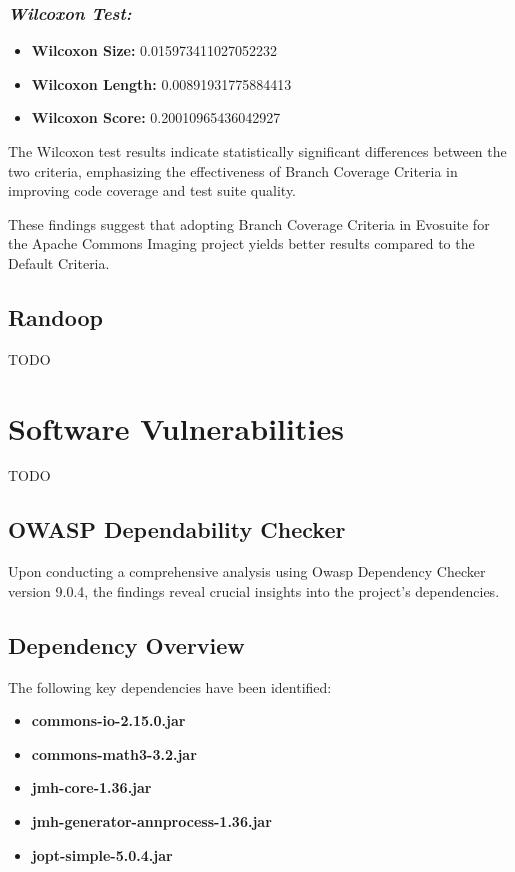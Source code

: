 \documentclass[sigconf]{acmart}
\begin{document}
\subsubsection{\textit{Wilcoxon Test:}}
\begin{itemize}
    \item \textbf{Wilcoxon Size:} 0.015973411027052232
    \item \textbf{Wilcoxon Length:} 0.00891931775884413
    \item \textbf{Wilcoxon Score:} 0.20010965436042927
\end{itemize}

The Wilcoxon test results indicate statistically significant differences between the two criteria, emphasizing the effectiveness of Branch Coverage Criteria in improving code coverage and test suite quality.

These findings suggest that adopting Branch Coverage Criteria in Evosuite for the Apache Commons Imaging project yields better results compared to the Default Criteria.

\subsection{Randoop}
TODO

\section{Software Vulnerabilities}
TODO

\subsection{OWASP Dependability Checker}
Upon conducting a comprehensive analysis using Owasp Dependency Checker\cite{owasp-dependency-check} version 9.0.4, the findings reveal crucial insights into the project's dependencies.

\subsection{Dependency Overview}

The following key dependencies have been identified:

\begin{itemize}
    \item \textbf{commons-io-2.15.0.jar}
    \item \textbf{commons-math3-3.2.jar}
    \item \textbf{jmh-core-1.36.jar}
    \item \textbf{jmh-generator-annprocess-1.36.jar}
    \item \textbf{jopt-simple-5.0.4.jar}
\end{itemize}
\end{document}
